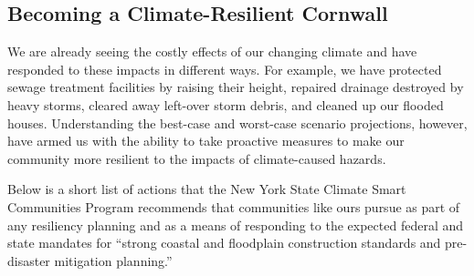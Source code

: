 \subsection*{Becoming a Climate-Resilient 
Cornwall}\label{subsec:climateresilient}
We are already seeing the costly effects of our changing climate and have 
responded to these impacts in different ways. For example, we have protected 
sewage treatment facilities by raising their height, repaired drainage 
destroyed by heavy storms, cleared away left-over storm debris, and cleaned up 
our flooded houses. Understanding the best-case and worst-case scenario 
projections, however, have armed us with the ability to take proactive measures 
to make our community more resilient to the impacts of climate-caused hazards. 
\par
Below is a short list of actions that the New York State Climate Smart 
Communities Program recommends that communities like ours pursue as part of any 
resiliency planning and as a means of responding to the expected federal and 
state mandates for ``strong coastal and floodplain construction standards and 
pre-disaster mitigation planning.''
